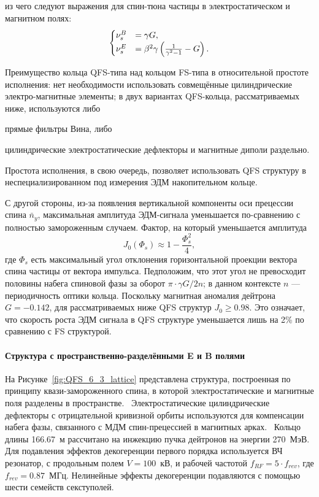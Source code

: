 из чего следуют выражения для спин-тюна частицы в электростатическом и магнитном полях:
\begin{equation}
	\begin{cases}
		\nu_s^B &= \gamma G, \\
		\nu_s^E &= \beta^2\gamma\bkt{\frac{1}{\gamma^2-1} - G}.
	\end{cases}
\end{equation}

Преимущество кольца QFS-типа над кольцом FS-типа в относительной простоте исполнения: нет необходимости использовать совмещённые цилиндрические электро-магнитные элементы; в двух вариантах QFS-кольца, рассматриваемых ниже, используются либо
\begin{enumerate*}
\item прямые фильтры Вина, либо
\item цилиндрические электростатические дефлекторы и магнитные диполи раздельно.
\end{enumerate*}
Простота исполнения, в свою очередь, позволяет использовать QFS структуру в неспециализированном под
измерения ЭДМ накопительном кольце.

С другой стороны, из-за появления вертикальной компоненты оси прецессии спина $\bar n_y$, максимальная амплитуда ЭДМ-сигнала уменьшается по-сравнению с полностью замороженным случаем. Фактор, на который уменьшается амплитуда~\cite{Senichev:QFS_IPAC15}
\[
J_0(\Phi_s) \approx 1 - \frac{\Phi_s^2}{4},
\]
где $\Phi_s$ есть максимальный угол отклонения горизонтальной проекции вектора спина частицы от вектора импульса. Педположим, что этот угол не превосходит половины набега спиновой фазы за оборот ${\pi\cdot \gamma G/2n}$; в данном контексте $n$ --- периодичность оптики кольца. Поскольку магнитная аномалия дейтрона 
${G = -0.142}$, для рассматриваемых ниже QFS структур ${J_0\ge 0.98}$.
Это означает, что скорость роста ЭДМ сигнала в QFS структуре уменьшается лишь на 2\% по сравнению с  FS структурой. 

\paragraph{Структура с пространственно-разделёнными E и B полями}\label{chpt2:lattice:QFS:6_3}

На Рисунке~\ref{fig:QFS_6_3_lattice} представлена структура, построенная по принципу 
квази-замороженного спина, в которой электростатические и магнитные поля 
разделены в пространстве.~\cite{Senichev:Lattices} Электростатические цилиндрические дефлекторы 
с отрицательной кривизной орбиты используются для компенсации набега фазы, 
связанного с МДМ спин-прецессией в магнитных арках.~\cite{Senichev:QFS_IPAC15} 
Кольцо длины 166.67~м рассчитано на инжекцию пучка дейтронов на энергии 270~МэВ. 
Для подавления эффектов декогеренции первого порядка используется ВЧ резонатор, 
с продольным полем ${V = 100}$~кВ, и рабочей частотой ${f_{RF} = 5\cdot f_{rev}}$, 
где ${f_{rev} = 0.87}$~МГц. Нелинейные эффекты декогеренции подавляются с помощью шести семейств секступолей.

